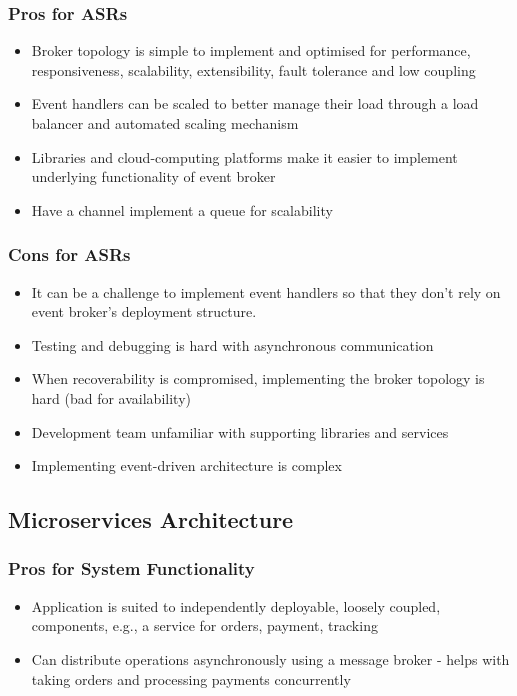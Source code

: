 \documentclass{article}
\begin{document}
\subsubsection*{Pros for ASRs}
\begin{itemize}
    \item Broker topology is simple to implement and optimised for performance, responsiveness, scalability, extensibility, fault tolerance and low coupling
    \item Event handlers can be scaled to better manage their load through a load balancer and automated scaling mechanism
    \item Libraries and cloud-computing platforms make it easier to implement underlying functionality of event broker
    \item Have a channel implement a queue for scalability
\end{itemize}
\subsubsection*{Cons for ASRs}
\begin{itemize}
    \item It can be a challenge to implement event handlers so that they don't rely on event broker's deployment structure.
    \item Testing and debugging is hard with asynchronous communication
    \item When recoverability is compromised, implementing the broker topology is hard (bad for availability)
    \item Development team unfamiliar with supporting libraries and services
    \item Implementing event-driven architecture is complex
\end{itemize}

\subsection{Microservices Architecture}
\subsubsection*{Pros for System Functionality}
\begin{itemize}
    \item Application is suited to independently deployable, loosely coupled, components, e.g., a service for orders, payment, tracking
    \item Can distribute operations asynchronously using a message broker - helps with taking orders and processing payments concurrently
\end{itemize}   
\end{document}
